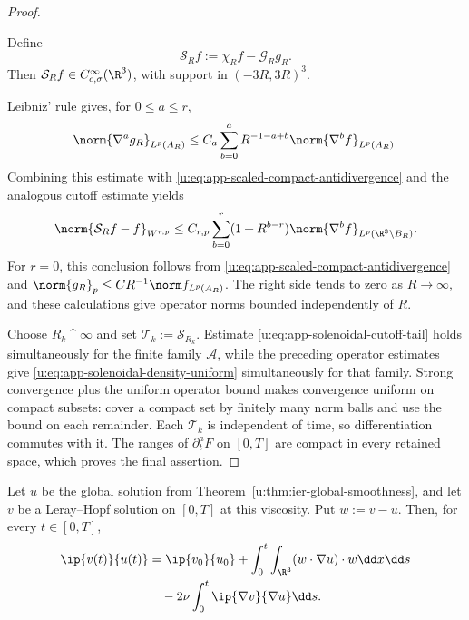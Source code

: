 \begin{proof}
\begin{samepage}
Define
\[
 \mathcal S_Rf:=\chi_Rf-\mathcal G_Rg_R.
\]
Then \(\mathcal S_Rf\in C_{c,\sigma}^\infty(\R^3)\), with support in
\((-3R,3R)^3\).
\end{samepage}
Leibniz' rule gives, for \(0\le a\le r\),
\[
 \norm{\nabla^ag_R}_{L^p(A_R)}
 \le C_a\sum_{b=0}^{a}
 R^{-1-a+b}\norm{\nabla^bf}_{L^p(A_R)}.
\]
Combining this estimate with
\eqref{u:eq:app-scaled-compact-antidivergence} and the analogous cutoff
estimate yields
\begin{equation}
 \norm{\mathcal S_Rf-f}_{W^{r,p}}
 \le C_{r,p}\sum_{b=0}^{r}
 (1+R^{b-r})\norm{\nabla^bf}_{L^p(\R^3\setminus B_R)}.
 \label{u:eq:app-solenoidal-cutoff-tail}
\end{equation}
For \(r=0\), this conclusion follows from
\eqref{u:eq:app-scaled-compact-antidivergence} and
\(\norm{g_R}_p\le C R^{-1}\norm f_{L^p(A_R)}\).
The right side tends to zero as \(R\to\infty\), and these calculations
give operator norms bounded independently of \(R\).

Choose \(R_k\uparrow\infty\) and set
\(\mathcal T_k:=\mathcal S_{R_k}\).  Estimate
\eqref{u:eq:app-solenoidal-cutoff-tail} holds simultaneously for the finite
family \(\mathscr A\), while the preceding operator estimates give
\eqref{u:eq:app-solenoidal-density-uniform} simultaneously for that family.
Strong convergence plus the uniform operator bound makes convergence
uniform on compact subsets: cover a compact set by finitely many norm balls
and use the bound on each remainder.  Each \(\mathcal T_k\) is independent
of time, so differentiation commutes with it.  The ranges of
\(\partial_t^aF\) on \([0,T]\) are compact in every retained space, which
proves the final assertion.
\end{proof}

\begin{lemma}
\label{u:lem:app-cross-energy}
Let \(u\) be the global solution from
Theorem~\ref{u:thm:ier-global-smoothness}, and let \(v\) be a Leray--Hopf
solution on \([0,T]\) at this viscosity.  Put \(w:=v-u\).  Then, for every
\(t\in[0,T]\),
\begin{align}
 \ip{v(t)}{u(t)}
 &=
 \ip{v_0}{u_0}
 +\int_0^t\int_{\R^3}
       (w\cdot\nabla u)\cdot w\dd x\dd s
 \notag\\
 &\quad
 -2\nu\int_0^t\ip{\nabla v}{\nabla u}\dd s.
 \label{u:eq:app-cross-energy}
\end{align}
\end{lemma}

